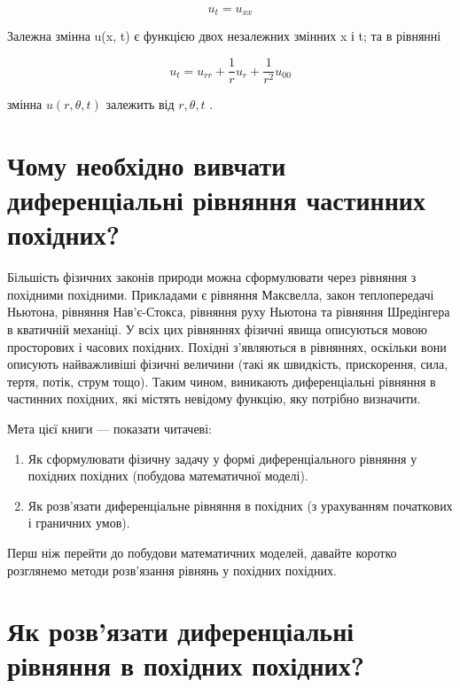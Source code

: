 \[u_t = u_{xx}\]

Залежна змінна u(x, t) є функцією двох незалежних змінних x і t; та в рівнянні

\[u_t = u_{rr} + \frac{1}{r} u_r + \frac{1}{r^2} u_{00}\]

змінна \(u(r, \theta, t)\) залежить від \(r, \theta, t\) .

\section{Чому необхідно вивчати диференціальні рівняння частинних похідних?}\label{ux447ux43eux43cux443-ux43dux435ux43eux431ux445ux456ux434ux43dux43e-ux432ux438ux432ux447ux430ux442ux438-ux434ux438ux444ux435ux440ux435ux43dux446ux456ux430ux43bux44cux43dux456-ux440ux456ux432ux43dux44fux43dux43dux44f-ux447ux430ux441ux442ux438ux43dux43dux438ux445-ux43fux43eux445ux456ux434ux43dux438ux445}

Більшість фізичних законів природи можна сформулювати через рівняння з похідними похідними. Прикладами є рівняння Максвелла, закон теплопередачі Ньютона, рівняння Нав'є-Стокса, рівняння руху Ньютона та рівняння Шредінгера в кватичній механіці. У всіх цих рівняннях фізичні явища описуються мовою просторових і часових похідних. Похідні з'являються в рівняннях, оскільки вони описують найважливіші фізичні величини (такі як швидкість, прискорення, сила, тертя, потік, струм тощо). Таким чином, виникають диференціальні рівняння в частинних похідних, які містять невідому функцію, яку потрібно визначити.

Мета цієї книги --- показати читачеві:

\begin{enumerate}
\def\labelenumi{\arabic{enumi}.}
\item
  Як сформулювати фізичну задачу у формі диференціального рівняння у похідних похідних (побудова математичної моделі).
\item
  Як розв'язати диференціальне рівняння в похідних (з урахуванням початкових і граничних умов).
\end{enumerate}

Перш ніж перейти до побудови математичних моделей, давайте коротко розглянемо методи розв'язання рівнянь у похідних похідних.

\section{Як розв'язати диференціальні рівняння в похідних похідних?}\label{ux44fux43a-ux440ux43eux437ux432ux44fux437ux430ux442ux438-ux434ux438ux444ux435ux440ux435ux43dux446ux456ux430ux43bux44cux43dux456-ux440ux456ux432ux43dux44fux43dux43dux44f-ux432-ux43fux43eux445ux456ux434ux43dux438ux445-ux43fux43eux445ux456ux434ux43dux438ux445}

